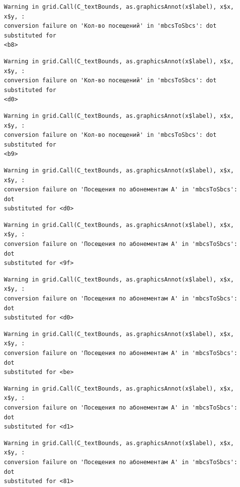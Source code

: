 \documentclass[
  letterpaper,
  DIV=11,
  numbers=noendperiod]{scrartcl}
\begin{document}
\begin{verbatim}
Warning in grid.Call(C_textBounds, as.graphicsAnnot(x$label), x$x, x$y, :
conversion failure on 'Кол-во посещений' in 'mbcsToSbcs': dot substituted for
<b8>
\end{verbatim}

\begin{verbatim}
Warning in grid.Call(C_textBounds, as.graphicsAnnot(x$label), x$x, x$y, :
conversion failure on 'Кол-во посещений' in 'mbcsToSbcs': dot substituted for
<d0>
\end{verbatim}

\begin{verbatim}
Warning in grid.Call(C_textBounds, as.graphicsAnnot(x$label), x$x, x$y, :
conversion failure on 'Кол-во посещений' in 'mbcsToSbcs': dot substituted for
<b9>
\end{verbatim}

\begin{verbatim}
Warning in grid.Call(C_textBounds, as.graphicsAnnot(x$label), x$x, x$y, :
conversion failure on 'Посещения по абонементам А' in 'mbcsToSbcs': dot
substituted for <d0>
\end{verbatim}

\begin{verbatim}
Warning in grid.Call(C_textBounds, as.graphicsAnnot(x$label), x$x, x$y, :
conversion failure on 'Посещения по абонементам А' in 'mbcsToSbcs': dot
substituted for <9f>
\end{verbatim}

\begin{verbatim}
Warning in grid.Call(C_textBounds, as.graphicsAnnot(x$label), x$x, x$y, :
conversion failure on 'Посещения по абонементам А' in 'mbcsToSbcs': dot
substituted for <d0>
\end{verbatim}

\begin{verbatim}
Warning in grid.Call(C_textBounds, as.graphicsAnnot(x$label), x$x, x$y, :
conversion failure on 'Посещения по абонементам А' in 'mbcsToSbcs': dot
substituted for <be>
\end{verbatim}

\begin{verbatim}
Warning in grid.Call(C_textBounds, as.graphicsAnnot(x$label), x$x, x$y, :
conversion failure on 'Посещения по абонементам А' in 'mbcsToSbcs': dot
substituted for <d1>
\end{verbatim}

\begin{verbatim}
Warning in grid.Call(C_textBounds, as.graphicsAnnot(x$label), x$x, x$y, :
conversion failure on 'Посещения по абонементам А' in 'mbcsToSbcs': dot
substituted for <81>
\end{verbatim}
\end{document}
